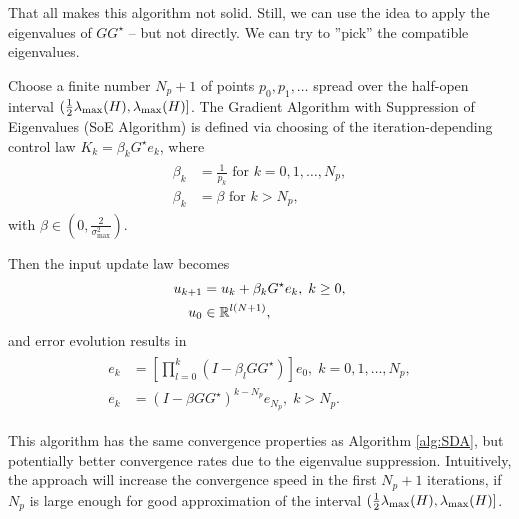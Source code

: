 That all makes this algorithm not solid. Still, we can use the idea to apply the eigenvalues of $G G^{\star}$ -- but not directly. We can try to ''pick'' the compatible eigenvalues.
\begin{alg}
	Choose a finite number $N_p + 1$ of points $p_0, p_1, \dots$ spread over the half-open interval $(\frac{1}{2}\lambda_{\mathrm{max}}(H), \lambda_{\mathrm{max}}(H)]$. 
	The Gradient Algorithm with Suppression of Eigenvalues (SoE Algorithm) is defined via choosing of the iteration-depending control law  $K_k = \beta_k G^\star e_k$, where 
	\begin{align}
	\begin{split}
	\beta_k &= \frac{1}{p_k} \text{ for } k = 0 , 1, \dots , N_p,\\
	\beta_k &= \beta  \text{ for } k > N_p,
	\end{split}
	\end{align}
	with $\beta \in (0, \frac{2}{\sigma_{\max}^2})$.
	
	Then the input update law becomes 
	\begin{align}
		u_{k+1} &= u_k + \beta_k G^\star e_k, \; k\geq 0,\\
		u_0 &\in {\mathbb{R}}^{l(N+1)}, 
	\end{align}
	and error evolution results in 
	\begin{align}
	\begin{split}
	e _{k} &= \left[\prod_{l = 0}^k (I - \beta_l  GG^\star) \right] e_{0}, \;  k = 0 , 1, \dots , N_p,\\
	e _{k} &=  (I - \beta GG^\star)^{k - N_p} e_{N_p}, \;  k > N_p.
	\end{split}
	\end{align}	
\end{alg}

This algorithm has the same convergence properties as Algorithm \ref{alg:SDA}, but potentially better convergence rates due to the eigenvalue suppression. Intuitively, the approach will increase the convergence speed in the first $N_p + 1$ iterations, if $N_p$ is large enough for good approximation of the interval $(\frac{1}{2} \lambda_{\mathrm{max}}(H), \lambda_{\mathrm{max}}(H)]$.

